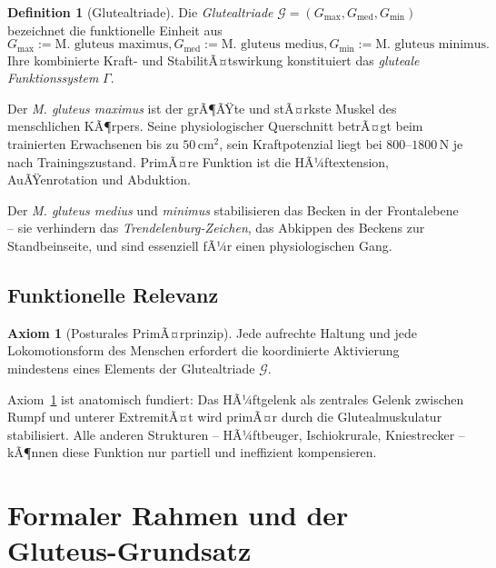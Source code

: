 ﻿\documentclass[12pt,a4paper]{report}
\theoremstyle{plain}
\theoremstyle{definition}
\newtheorem{definition}[theorem]{Definition}
\newtheorem{axiom}[theorem]{Axiom}
\theoremstyle{remark}
\newcommand{\med}{\mathrm{med}}  %
\begin{document}
	\begin{definition}[Glutealtriade]
		Die \emph{Glutealtriade} $\mathcal{G} = (G_{\max}, G_{\med}, G_{\min})$
		bezeichnet die funktionelle Einheit aus
		\[
		G_{\max} := \text{M. gluteus maximus},
		G_{\med} := \text{M. gluteus medius},
		G_{\min} := \text{M. gluteus minimus.}
		\]
		Ihre kombinierte Kraft- und StabilitÃ¤tswirkung konstituiert das
		\emph{gluteale Funktionssystem} $\Gamma$.
	\end{definition}
	
	Der \emph{M. gluteus maximus} ist der grÃ¶ÃŸte und stÃ¤rkste Muskel des
	menschlichen KÃ¶rpers. Seine physiologischer Querschnitt betrÃ¤gt beim
	trainierten Erwachsenen bis zu $50\,\mathrm{cm}^2$,
	sein Kraftpotenzial liegt bei $800$--$1800\,\mathrm{N}$
	je nach Trainingszustand. PrimÃ¤re Funktion ist die HÃ¼ftextension,
	AuÃŸenrotation und Abduktion.
	
	Der \emph{M. gluteus medius} und \emph{minimus} stabilisieren das Becken
	in der Frontalebene -- sie verhindern das \emph{Trendelenburg-Zeichen},
	das Abkippen des Beckens zur Standbeinseite, und sind essenziell
	fÃ¼r einen physiologischen Gang.
	
	\section{Funktionelle Relevanz}
	
	\begin{axiom}[Posturales PrimÃ¤rprinzip]
		\label{ax:postural}
		Jede aufrechte Haltung und jede Lokomotionsform des Menschen erfordert
		die koordinierte Aktivierung mindestens eines Elements der Glutealtriade $\mathcal{G}$.
	\end{axiom}
	
	Axiom~\ref{ax:postural} ist anatomisch fundiert: Das HÃ¼ftgelenk als zentrales
	Gelenk zwischen Rumpf und unterer ExtremitÃ¤t wird primÃ¤r durch die
	Glutealmuskulatur stabilisiert. Alle anderen Strukturen -- HÃ¼ftbeuger,
	Ischiokrurale, Kniestrecker -- kÃ¶nnen diese Funktion nur partiell und
	ineffizient kompensieren.
	
	\chapter{Formaler Rahmen und der Gluteus-Grundsatz}
	\label{chap:formalisierung}
	
\end{document}

